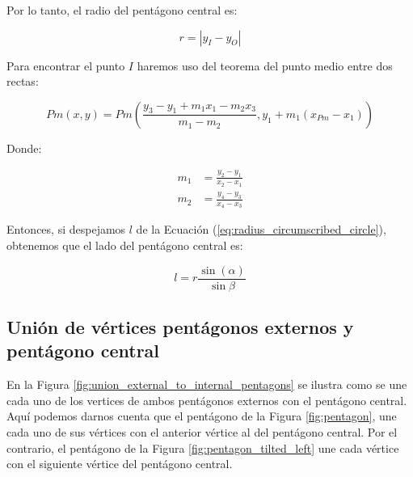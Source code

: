 \documentclass[oneside, a4paper]{article}
\begin{document}
            Por lo tanto, el radio del pentágono central es:

            \begin{equation}
                r = |y_{I} - y_{O}|
                \label{eq:radius_center_pentagon}
            \end{equation}

            Para encontrar el punto $I$ haremos uso del teorema del punto medio entre dos rectas:
            
            \begin{equation}
                Pm(x, y) = Pm(\frac{y_{3} - y_{1} + m_{1}x_{1} - m_{2}x_{3}}{m_{1} - m_{2}}, y_{1} + m_{1}(x_{Pm} - x_{1}))
                \label{eq:intersection_point_between_straight_lines}
            \end{equation}

            Donde:

            \begin{align*}
                m_{1} & = \frac{y_{2} - y_{1}}{x_{2} - x_{1}}\\
                m_{2} & = \frac{y_{4} - y_{3}}{x_{4} - x_{3}}
            \end{align*}

            Entonces, si despejamos $l$ de la Ecuación (\ref{eq:radius_circumscribed_circle}), obtenemos que el lado del pentágono central es:

            \begin{equation}
                l = r\frac{\sin(\alpha)}{\sin{\beta}}
                \label{eq:pentagon_side}
            \end{equation}

        \subsection{Unión de vértices pentágonos externos y pentágono central}
            En la Figura \ref{fig:union_external_to_internal_pentagons} se ilustra como se une cada uno de los vertices de ambos pentágonos externos con el pentágono central. Aquí podemos darnos cuenta que el pentágono de la Figura \ref{fig:pentagon}, une cada uno de sus vértices con el anterior vértice al del pentágono central. Por el contrario, el pentágono de la Figura \ref{fig:pentagon_tilted_left} une cada vértice con el siguiente vértice del pentágono central.
            
\end{document}
